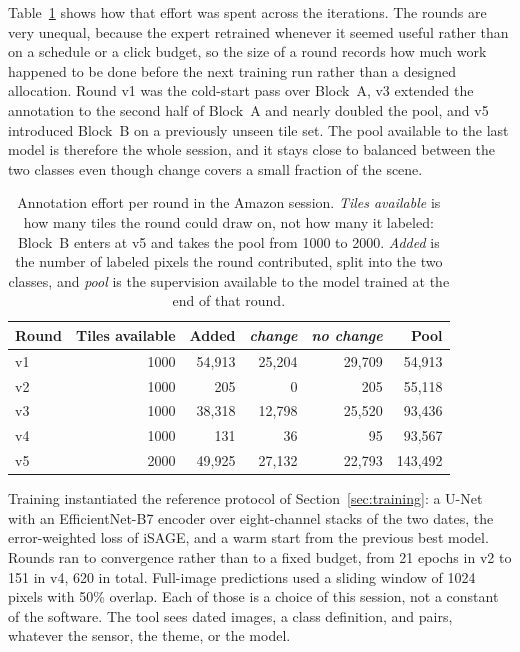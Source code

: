 Table~\ref{tab:rounds} shows how that effort was spent across the
iterations. The rounds are very unequal, because the expert
retrained whenever it seemed useful rather than on a schedule or a
click budget, so the size of a round records how much work
happened to be done before the next training run rather than a
designed allocation. Round v1 was the cold-start pass over
Block~A, v3 extended the annotation to the second half of Block~A
and nearly doubled the pool, and v5 introduced Block~B on a
previously unseen tile set. The pool available to the last model
is therefore the whole session, and it stays close to balanced
between the two classes even though change covers a small
fraction of the scene.

\begin{table}[!h]
\centering
\small
\caption{Annotation effort per round in the Amazon session.
\emph{Tiles available} is how many tiles the round could draw on,
not how many it labeled: Block~B enters at v5 and takes the pool
from 1000 to 2000. \emph{Added} is the number of labeled pixels the
round contributed, split into the two classes, and \emph{pool} is
the supervision available to the model trained at the end of that
round.}
\label{tab:rounds}
\begin{tabular}{@{}lrrrrr@{}}
\toprule
Round & Tiles available & Added & \emph{change} & \emph{no change} & Pool \\
\midrule
v1 & 1000 & 54{,}913 & 25{,}204 & 29{,}709 & 54{,}913 \\
v2 & 1000 &      205 &        0 &      205 & 55{,}118 \\
v3 & 1000 & 38{,}318 & 12{,}798 & 25{,}520 & 93{,}436 \\
v4 & 1000 &      131 &       36 &       95 & 93{,}567 \\
v5 & 2000 & 49{,}925 & 27{,}132 & 22{,}793 & 143{,}492 \\
\bottomrule
\end{tabular}
\end{table}

Training instantiated the reference protocol of
Section~\ref{sec:training}: a U-Net with an EfficientNet-B7
encoder over eight-channel stacks of the two dates, the
error-weighted loss of iSAGE, and a warm start from the previous
best model. Rounds ran to convergence rather than to a fixed
budget, from 21 epochs in v2 to 151 in v4, 620 in total.
Full-image predictions used a
sliding window of 1024 pixels with 50\% overlap. Each of those is
a choice of this session, not a constant of the software. The tool
sees dated images, a class definition, and pairs, whatever the
sensor, the theme, or the model.

